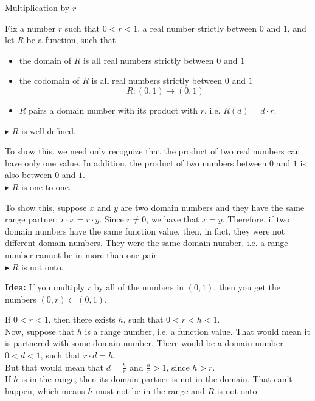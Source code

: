 \documentclass{ximera}
\begin{document}
\begin{example} Multiplication by $r$ 



Fix a number $r$ such that $0 < r < 1$, a real number strictly between $0$ and $1$, and let $R$ be a function, such that

\begin{itemize}
\item the domain of $R$ is all real numbers strictly between $0$ and $1$  
\item the codomain of $R$ is all real numbers strictly between $0$ and $1$  
\[
R : (0,1) \mapsto (0,1)
\]
\item $R$ pairs a domain number with its product with $r$, i.e. $R(d) = d \cdot r$.
\end{itemize}





$\blacktriangleright$ $R$ is well-defined.  

To show this, we need only recognize that the product of two real numbers can have only one value.  In addition, the product of two numbers between $0$ and $1$ is also between $0$ and $1$.  \\


$\blacktriangleright$ $R$ is one-to-one. 

To show this, suppose $x$ and $y$ are two domain numbers and they have the same range partner: $r \cdot x = r \cdot y$.  Since $r \ne 0$, we have that $x = y$. Therefore, if two domain numbers have the same function value, then, in fact, they were not different domain numbers.  They were the same domain number. i.e. a range number cannot be in more than one pair.\\


$\blacktriangleright$ $R$ is not onto.

\textbf{Idea:} If you multiply $r$ by all of the numbers in $(0,1)$, then you get the numbers $(0,r) \subset (0, 1)$.\\

\begin{explanation}
If $0 < r < 1$, then there exists $h$, such that $0 < r < h < 1$.  \\

Now, suppose that $h$ is a range number, i.e. a function value. That would mean it is partnered with some domain number.  There would be a domain number $0 < d < 1$, such that  $r \cdot d = h$.  \\


But that would mean that $d = \frac{h}{r}$ and $\frac{h}{r} > 1$, since $h > r$.  \\


If $h$ is in the range, then its domain partner is not in the domain.  That can't happen, which means $h$ must not be in the range and $R$ is not onto.
\end{explanation}




\end{example} 
\end{document}
